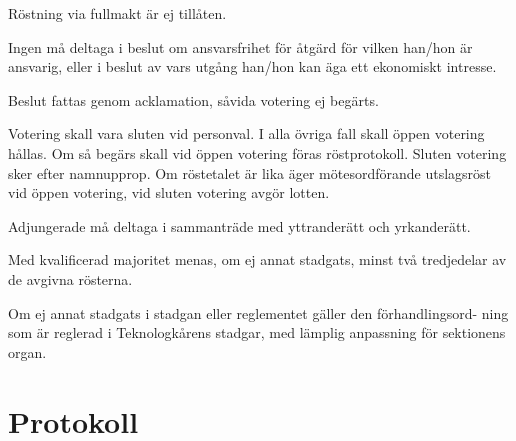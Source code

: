 \documentclass[stadgar]{dsekprotokoll}
\begin{document}
\begin{stadgeavsnitt}


Röstning via fullmakt är ej tillåten.


Ingen må deltaga i beslut om ansvarsfrihet för åtgärd för vilken han/hon är
ansvarig, eller i beslut av vars utgång han/hon kan äga ett ekonomiskt
intresse.


Beslut fattas genom acklamation, såvida votering ej begärts.


Votering skall vara sluten vid personval. I alla övriga fall skall öppen
votering hållas. Om så begärs skall vid öppen votering föras röstprotokoll.
Sluten votering sker efter namnupprop. Om röstetalet är lika äger
mötesordförande utslagsröst vid öppen votering, vid sluten votering avgör
lotten.


Adjungerade må deltaga i sammanträde med yttranderätt och yrkanderätt.


Med kvalificerad majoritet menas, om ej annat stadgats, minst två
tredjedelar av de avgivna rösterna.


Om ej annat stadgats i stadgan eller reglementet gäller den förhandlingsord- ning som är reglerad i Teknologkårens stadgar, med lämplig anpassning för sektionens organ.

\end{stadgeavsnitt}

\section{Protokoll}
\end{document}
